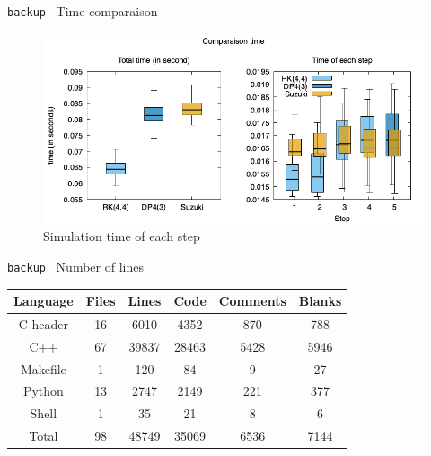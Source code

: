 \documentclass{beamer}
\newcommand{\backupend}{
  \setcounter{framenumber}{\value{finalframe}}
}
\newenvironment{bframe}[1]%
{%
  \begin{frame}{{\small\texttt{backup}\ } #1}
}%
{%
  \end{frame}
}
\begin{document}
\begin{bframe}{Time comparaison}
  \begin{figure}
    \includegraphics[width=\textwidth]{img/timer_boxplot_t4}
    \caption{Simulation time of each step}
  \end{figure}
\end{bframe}

\begin{bframe}{Number of lines}
  \begin{table}
    \centering
    \begin{tabular}{c|ccccc}
      Language & Files & Lines & Code & Comments & Blanks \\
      \hline
      C header & 16    & 6010  & 4352  & 870     & 788  \\
      C++      & 67    & 39837 & 28463 & 5428    & 5946 \\
      Makefile & 1     & 120   & 84    & 9       & 27   \\
      Python   & 13    & 2747  & 2149  & 221     & 377  \\
      Shell    & 1     & 35    & 21    & 8       & 6    \\
      \hline
      Total    & 98    & 48749 & 35069 & 6536    & 7144
      
    \end{tabular}
  \end{table}
\end{bframe}

\backupend
\end{document}
